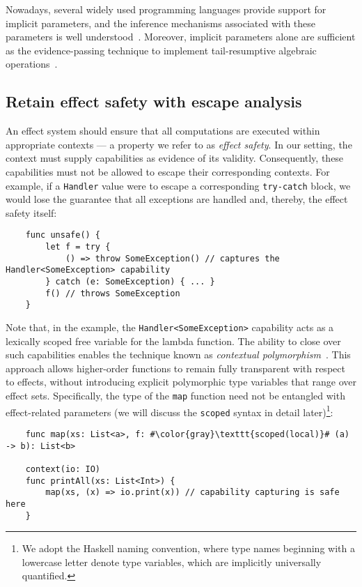 \documentclass[acmsmall,review,screen]{acmart}
\begin{document}
Nowadays, several widely used programming languages provide support for implicit parameters, and the inference mechanisms associated with these parameters is well understood~\cite{KEEP-context-parameters, oliveira2010type, lewis2000implicit}.
Moreover, implicit parameters alone are sufficient as the evidence-passing technique to implement tail-resumptive algebraic operations~\cite{xie2020effect}.

\subsection{Retain effect safety with escape analysis} \label{subsec:escape}

An effect system should ensure that all computations are executed within appropriate contexts --- a property we refer to as \textit{effect safety}.
In our setting, the context must supply capabilities as evidence of its validity.
Consequently, these capabilities must not be allowed to escape their corresponding contexts.
For example, if a \texttt{Handler} value were to escape a corresponding \texttt{try-catch} block, we would lose the guarantee that all exceptions are handled and, thereby, the effect safety itself:
\begin{verbatim}
    func unsafe() {
        let f = try {
            () => throw SomeException() // captures the Handler<SomeException> capability
        } catch (e: SomeException) { ... }
        f() // throws SomeException
    }
\end{verbatim}

Note that, in the example, the \texttt{Handler<SomeException>} capability acts as a lexically scoped free variable for the lambda function.
The ability to close over such capabilities enables the technique known as \textit{contextual polymorphism}~\cite{brachthauser2020effects, brachthauser2022effects}.
This approach allows higher-order functions to remain fully transparent with respect to effects, without introducing explicit polymorphic type variables that range over effect sets.
Specifically, the type of the \texttt{map} function need not be entangled with effect-related parameters (we will discuss the \texttt{scoped} syntax in detail later)\footnote{We adopt the Haskell naming convention, where type names beginning with a lowercase letter denote type variables, which are implicitly universally quantified.}: %
\begin{verbatim}
    func map(xs: List<a>, f: #\color{gray}\texttt{scoped(local)}# (a) -> b): List<b>

    context(io: IO)
    func printAll(xs: List<Int>) {
        map(xs, (x) => io.print(x)) // capability capturing is safe here
    }
\end{verbatim}
\end{document}
